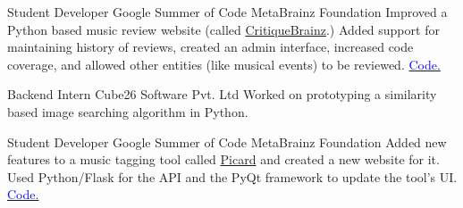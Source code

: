     {Student Developer}
    {Google Summer of Code}
    {MetaBrainz Foundation}
    {}
    {
        Improved a Python based music review website (called \href{http://critiquebrainz.org/}{CritiqueBrainz}.)
        Added support for maintaining history of reviews,
        created an admin interface,
        increased code coverage,
        and allowed other entities (like musical events) to be reviewed.
        \hfill
        \href{https://bitbucket.org/metabrainz/critiquebrainz/commits/all?author=dufferzafar}{\textcolor{blue}{\scriptsize Code.}}
    }
    \vspace*{0.2\baselineskip}

    {Backend Intern}
    {Cube26 Software Pvt. Ltd}
    {}
    {}
    {
        Worked on prototyping a similarity based image searching algorithm in Python.
    }
    \vspace*{0.2\baselineskip}

    {Student Developer}
    {Google Summer of Code}
    {MetaBrainz Foundation}
    {}
    {
        Added new features to a music tagging tool called \href{http://picard.musicbrainz.org/}{Picard} and created a new website for it.
        \newline
        Used Python/Flask for the API
        and the PyQt framework to update the tool's UI.
        \hfill
        \href{https://github.com/musicbrainz/picard-website/commits?author=dufferzafar}{\textcolor{blue}{\scriptsize Code.}}
    }
    \vspace*{0.2\baselineskip}
